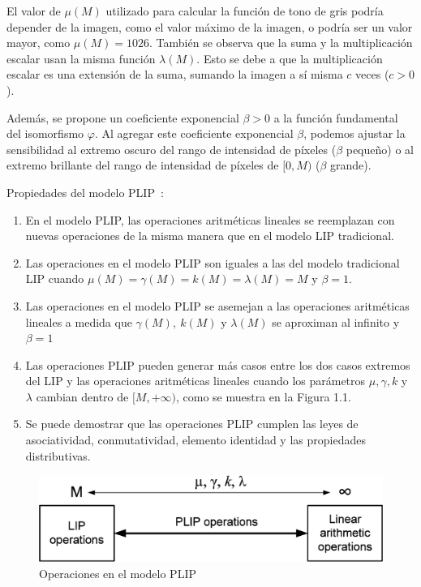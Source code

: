 El valor de $\mu(M)$ utilizado para calcular la función de tono de gris podría depender de la imagen, como el valor máximo de la imagen, o podría ser un valor mayor, como $\mu(M) = 1026$. También se observa que la suma y la multiplicación escalar usan la misma función $\lambda(M)$. Esto se debe a que la multiplicación escalar es una extensión de la suma, sumando la imagen a sí misma $c$ veces ($c>0$).

Además, se propone un coeficiente exponencial $\beta>0$ a la función fundamental del isomorfismo $\varphi$. Al agregar este coeficiente exponencial $\beta$, podemos ajustar la sensibilidad al extremo oscuro del rango de intensidad de píxeles ($\beta$ pequeño) o al extremo brillante del rango de intensidad de píxeles de $[0, M)$ ($\beta$ grande).

Propiedades del modelo PLIP~\cite{panetta2010parameterized}:

\begin{enumerate}
	\item En el modelo PLIP, las operaciones aritméticas lineales se reemplazan con nuevas operaciones de la misma manera que en el modelo LIP tradicional.
	\item Las operaciones en el modelo PLIP son iguales a las del modelo tradicional LIP cuando $\mu(M) = \gamma(M) = k(M) = \lambda(M) = M$ y
	$\beta = 1$.
	\item Las operaciones en el modelo PLIP se asemejan a las operaciones aritméticas lineales a medida que $\gamma(M),~k(M)$ y $\lambda(M)$ se aproximan al infinito y $\beta = 1$
	\item Las operaciones PLIP pueden generar más casos entre los dos casos extremos del LIP y las operaciones aritméticas lineales cuando los parámetros $\mu, \gamma, k$ y $\lambda$ cambian dentro de $[M, +\infty)$, como se muestra en la Figura 1.1.
	\item Se puede demostrar que las operaciones PLIP cumplen las leyes de asociatividad, conmutatividad, elemento identidad y las propiedades distributivas.
\end{enumerate}

\begin{figure}
	\begin{center}
		\caption{Operaciones en el modelo PLIP}
		\includegraphics[width=8.0 cm]{images/plip_scheme.png}
	\end{center}
\end{figure}

